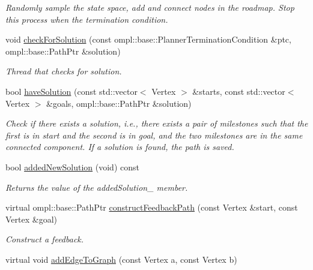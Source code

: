 \begin{DoxyCompactItemize}
\begin{DoxyCompactList}\small\item\em \-Randomly sample the state space, add and connect nodes in the roadmap. \-Stop this process when the termination condition. \end{DoxyCompactList}\item 
\hypertarget{class_f_i_r_m_a4c909fc53ceeeecb6992ccebf0ab60d6}{void \hyperlink{class_f_i_r_m_a4c909fc53ceeeecb6992ccebf0ab60d6}{check\-For\-Solution} (const ompl\-::base\-::\-Planner\-Termination\-Condition \&ptc, ompl\-::base\-::\-Path\-Ptr \&solution)}\label{class_f_i_r_m_a4c909fc53ceeeecb6992ccebf0ab60d6}

\begin{DoxyCompactList}\small\item\em \-Thread that checks for solution. \end{DoxyCompactList}\item 
\hypertarget{class_f_i_r_m_ab237fb0d7978ef4156769fc7c1d77b2b}{bool \hyperlink{class_f_i_r_m_ab237fb0d7978ef4156769fc7c1d77b2b}{have\-Solution} (const std\-::vector$<$ \-Vertex $>$ \&starts, const std\-::vector$<$ \-Vertex $>$ \&goals, ompl\-::base\-::\-Path\-Ptr \&solution)}\label{class_f_i_r_m_ab237fb0d7978ef4156769fc7c1d77b2b}

\begin{DoxyCompactList}\small\item\em \-Check if there exists a solution, i.\-e., there exists a pair of milestones such that the first is in {\itshape start\/} and the second is in {\itshape goal\/}, and the two milestones are in the same connected component. \-If a solution is found, the path is saved. \end{DoxyCompactList}\item 
\hypertarget{class_f_i_r_m_a341a81deb4e550fbacf6c239a801d2a8}{bool \hyperlink{class_f_i_r_m_a341a81deb4e550fbacf6c239a801d2a8}{added\-New\-Solution} (void) const }\label{class_f_i_r_m_a341a81deb4e550fbacf6c239a801d2a8}

\begin{DoxyCompactList}\small\item\em \-Returns the value of the added\-Solution\-\_\- member. \end{DoxyCompactList}\item 
virtual ompl\-::base\-::\-Path\-Ptr \hyperlink{class_f_i_r_m_a28ff922dfb8df66dbb82a6b6078959a0}{construct\-Feedback\-Path} (const \-Vertex \&start, const \-Vertex \&goal)
\begin{DoxyCompactList}\small\item\em \-Construct a feedback. \end{DoxyCompactList}\item 
\hypertarget{class_f_i_r_m_a9774dc171985f4521c02b5db8552397f}{virtual void \hyperlink{class_f_i_r_m_a9774dc171985f4521c02b5db8552397f}{add\-Edge\-To\-Graph} (const \-Vertex a, const \-Vertex b)}\label{class_f_i_r_m_a9774dc171985f4521c02b5db8552397f}


\end{DoxyCompactItemize}
